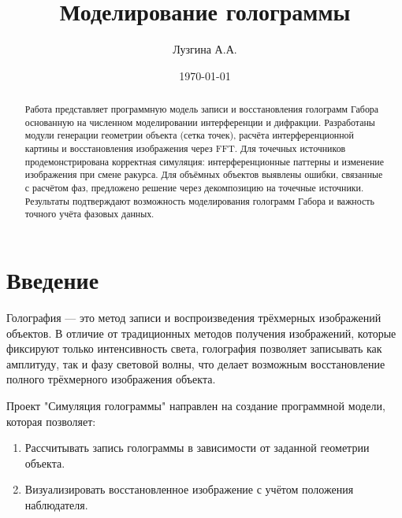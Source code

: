 \documentclass[aps,twocolumn,secnumarabic,balancelastpage,amsmath,amssymb,nofootinbib, floatfix]{revtex4-1}
\begin{document}
	\title{Моделирование голограммы\\}
	\author{Лузгина А.А.}
	\date{\today}
	
	
	\begin{abstract}
		Работа представляет программную модель записи и восстановления голограмм Габора основанную на численном моделировании интерференции и дифракции. Разработаны модули генерации геометрии объекта (сетка точек), расчёта интерференционной картины и восстановления изображения через FFT. Для точечных источников продемонстрирована корректная симуляция: интерференционные паттерны и изменение изображения при смене ракурса. Для объёмных объектов выявлены ошибки, связанные с расчётом фаз, предложено решение через декомпозицию на точечные источники. Результаты подтверждают возможность моделирования голограмм Габора и важность точного учёта фазовых данных. 
	\end{abstract}
	
	\maketitle
	
	
	
	



		\section{Введение}  

Голография — это метод записи и воспроизведения трёхмерных изображений объектов. В отличие от традиционных методов получения изображений, которые фиксируют только интенсивность света, голография позволяет записывать как амплитуду, так и фазу световой волны, что делает возможным восстановление полного трёхмерного изображения объекта.  

Проект "Симуляция голограммы" направлен на создание программной модели, которая позволяет:  \begin{enumerate}
\item Рассчитывать запись голограммы в зависимости от заданной геометрии объекта.  
\item Визуализировать восстановленное изображение с учётом положения наблюдателя.  
\end{enumerate}
\end{document}
